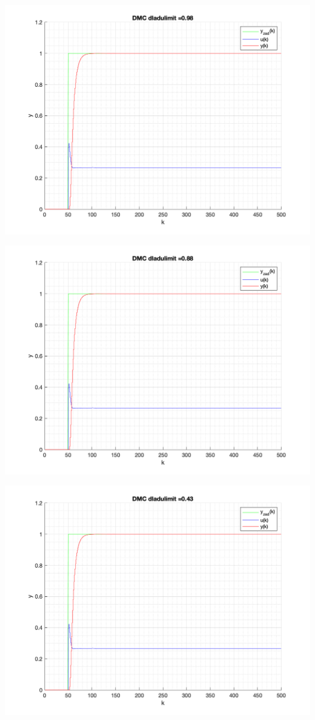 \documentclass[a4paper, 11pt]{article}
\begin{document}
\begin{enumerate}
 \includegraphics[width=\linewidth]{./ModelsP6_dulimit/P4_DMC_dulimit_0_98_png.png} 
 
 \includegraphics[width=\linewidth]{./ModelsP6_dulimit/P4_DMC_dulimit_0_88_png.png} 
 
 \includegraphics[width=\linewidth]{./ModelsP6_dulimit/P4_DMC_dulimit_0_43_png.png} 
 

\end{enumerate}
\end{document}
